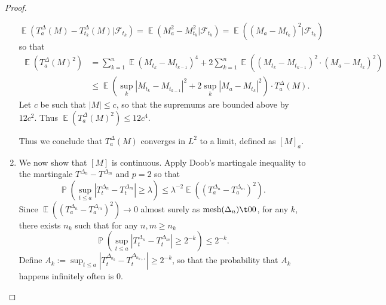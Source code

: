 \documentclass[11pt, a4paper]{memoir}
\theoremstyle{change}
\theoremstyle{plain}
\theoremstyle{nonumberplain}
\newtheorem{proof}{Proof}
\DeclareMathOperator{\pr}{{\mathbb{P}}}
\DeclareMathOperator{\E}{{\mathbb{E}}}
\DeclareMathOperator{\mesh}{mesh}
\numberwithin{equation}{section}
\begin{document}
\begin{proof}
\begin{enumerate}[nl]
\begin{equation*}
                \E(T_a^\Delta(M)-T_{t_k}^\Delta(M)|\mathcal{F}_{t_k}) = \E(M_a^2-M_{t_k}^2|\mathcal{F}_{t_k}) = \E((M_a-M_{t_k})^2|\mathcal{F}_{t_k})
            \end{equation*}
            so that
            \begin{align*}
                \E(T_a^\Delta(M)^2) &= \sum_{k=1}^n\E(M_{t_k}-M_{t_{k-1}})^4+2\sum_{k=1}^n\E((M_{t_k}-M_{t_{k-1}})^2\cdot(M_a-M_{t_k})^2)\\
                                    &\leq\E\left(\sup_k|M_{t_k}-M_{t_{k-1}}|^2+2\sup_k|M_a-M_{t_k}|^2\right)\cdot T_a^\Delta(M).
            \end{align*}
            Let $c$ be such that $|M|\leq c$, so that the supremums are bounded above by $12c^2$.
            Thus $\E(T_a^\Delta(M)^2)\leq 12c^4$.

            Thus we conclude that $T_a^\Delta(M)$ converges in $L^2$ to a limit, defined as $[M]_a$.
        \item We now show that $[M]$ is continuous.
            Apply Doob's martingale inequality to the martingale $T^{\Delta_n}-T^{\Delta_m}$ and $p=2$ so that
            \begin{equation*}
                \pr(\sup_{t\leq a}|T_t^{\Delta_n}-T_t^{\Delta_m}|\geq\lambda)\leq\lambda^{-2}\E((T_a^{\Delta_n}-T_a^{\Delta_m})^2).
            \end{equation*}
            Since $\E((T_a^{\Delta_n}-T_a^{\Delta_m})^2)\to 0$ almost surely as $\mesh(\Delta_n)\t0 0$, for any $k$, there exists $n_k$ such that for any $n,m\geq n_k$
            \begin{equation*}
                \pr(\sup_{t\leq a}|T_t^{\Delta_n}-T_t^{\Delta_m}|\geq 2^{-k})\leq 2^{-k}.
            \end{equation*}
            Define $A_k:=\sup_{t\leq a}|T_t^{\Delta_{n_k}}-T_t^{\Delta_{n_{k+1}}}|\geq 2^{-k}$, so that the probability that $A_k$ happens infinitely often is 0.


\end{enumerate}
\end{proof}
\end{document}
